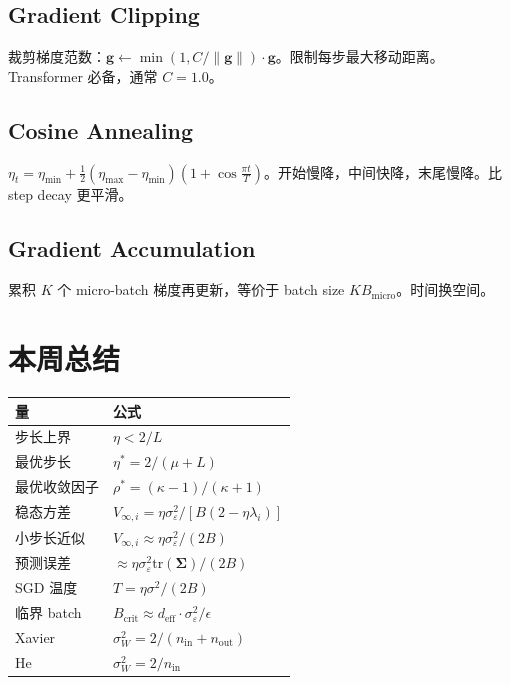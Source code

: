 \documentclass[12pt, a4paper]{ctexart}
\begin{document}
\subsection{Gradient Clipping}

裁剪梯度范数：$\mathbf{g} \gets \min(1, C/\|\mathbf{g}\|) \cdot \mathbf{g}$。限制每步最大移动距离。Transformer 必备，通常 $C=1.0$。

\subsection{Cosine Annealing}

$\eta_t = \eta_{\min} + \frac{1}{2}(\eta_{\max}-\eta_{\min})(1+\cos\frac{\pi t}{T})$。开始慢降，中间快降，末尾慢降。比 step decay 更平滑。

\subsection{Gradient Accumulation}

累积 $K$ 个 micro-batch 梯度再更新，等价于 batch size $KB_{\text{micro}}$。时间换空间。


\section{本周总结}

\begin{keypoint}[核心公式速查]
\begin{center}
\begin{tabular}{ll}
\toprule
\textbf{量} & \textbf{公式} \\
\midrule
步长上界 & $\eta < 2/L$ \\
最优步长 & $\eta^* = 2/(\mu + L)$ \\
最优收敛因子 & $\rho^* = (\kappa-1)/(\kappa+1)$ \\
稳态方差 & $V_{\infty,i} = \eta\sigma_\varepsilon^2/[B(2-\eta\lambda_i)]$ \\
小步长近似 & $V_{\infty,i} \approx \eta\sigma_\varepsilon^2/(2B)$ \\
预测误差 & $\approx \eta\sigma_\varepsilon^2\text{tr}(\boldsymbol{\Sigma})/(2B)$ \\
SGD 温度 & $T = \eta\sigma^2/(2B)$ \\
临界 batch & $B_{\text{crit}} \approx d_{\text{eff}} \cdot \sigma_\varepsilon^2/\epsilon$ \\
Xavier & $\sigma_W^2 = 2/(n_{\text{in}}+n_{\text{out}})$ \\
He & $\sigma_W^2 = 2/n_{\text{in}}$ \\
\bottomrule
\end{tabular}
\end{center}
\end{keypoint}
\end{document}
